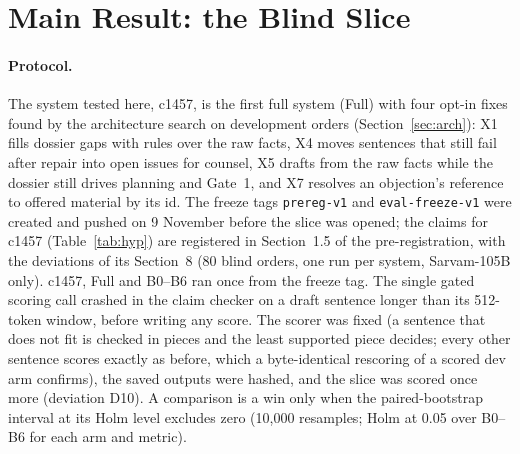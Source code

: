 \section{Main Result: the Blind Slice}
\label{sec:blind}

\paragraph{Protocol.} The system tested here, c1457, is the first full system (Full) with four opt-in fixes found by the architecture search on development orders (Section~\ref{sec:arch}): X1 fills dossier gaps with rules over the raw facts, X4 moves sentences that still fail after repair into open issues for counsel, X5 drafts from the raw facts while the dossier still drives planning and Gate~1, and X7 resolves an objection's reference to offered material by its id. The freeze tags \texttt{prereg-v1} and \texttt{eval-freeze-v1} were created and pushed on 9 November before the slice was opened; the claims for c1457 (Table~\ref{tab:hyp}) are registered in Section~1.5 of the pre-registration, with the deviations of its Section~8 (80 blind orders, one run per system, Sarvam-105B only). c1457, Full and B0--B6 ran once from the freeze tag. The single gated scoring call crashed in the claim checker on a draft sentence longer than its 512-token window, before writing any score. The scorer was fixed (a sentence that does not fit is checked in pieces and the least supported piece decides; every other sentence scores exactly as before, which a byte-identical rescoring of a scored dev arm confirms), the saved outputs were hashed, and the slice was scored once more (deviation D10). A comparison is a win only when the paired-bootstrap interval at its Holm level excludes zero (10{,}000 resamples; Holm at 0.05 over B0--B6 for each arm and metric).


